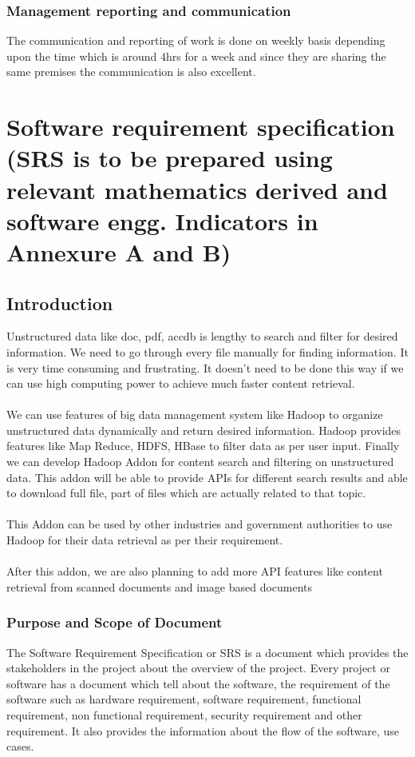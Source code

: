 \documentclass[oneside,a4paper,12pt]{report}
\begin{document}
\subsection{Management reporting and communication}
The communication and reporting of work is done on weekly basis depending upon the time which is around 4hrs for a week and since they are sharing the same premises the communication is also excellent.
 
\chapter{Software requirement specification  (SRS is to be prepared using relevant mathematics derived and software engg. Indicators in Annexure A and B)}

\section{Introduction}
Unstructured data like doc, pdf, accdb is lengthy to search and filter for desired information. We need to go through every file manually for finding information. It is very time consuming and frustrating. It doesn’t need to be done this way if we can use high computing power to achieve much faster content retrieval.\\\\
We can use features of big data management system like Hadoop to organize unstructured data dynamically and return desired information. Hadoop provides features like Map Reduce, HDFS, HBase to filter data as per user input. Finally we can develop Hadoop Addon for content search and filtering on unstructured data. This addon will be able to provide APIs for different search results and able to download full file, part of files which are actually related to that topic.\\\\
This Addon can be used by other industries and government authorities to use Hadoop for their data retrieval as per their requirement.\\\\
After this addon, we are also planning to add more API features like content retrieval from scanned documents and image based documents

\subsection{Purpose and Scope of Document}
The Software Requirement Specification or SRS is a document which provides the stakeholders in the project about the overview of the project. Every project or software has a document which tell about the software, the requirement of the software such as hardware requirement, software requirement, functional requirement, non functional requirement, security requirement and other requirement. It also provides the information about the flow of the software, use cases. \\
\end{document}
